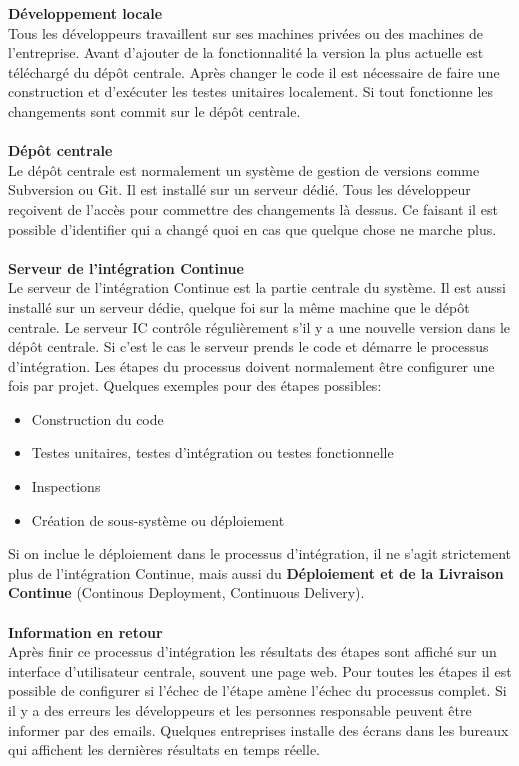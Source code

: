 \textbf{Développement locale}\\
Tous les développeurs travaillent sur ses machines privées ou des machines de l'entreprise. Avant d'ajouter de la fonctionnalité la version la plus actuelle est téléchargé du dépôt centrale. Après changer le code il est nécessaire de faire une construction et d'exécuter les testes unitaires localement. Si tout fonctionne les changements sont commit sur le dépôt centrale.\\\\
\textbf{Dépôt centrale}\\
Le dépôt centrale est normalement un système de gestion de versions comme Subversion ou Git. Il est installé sur un serveur dédié. Tous les développeur reçoivent de l'accès pour commettre des changements là dessus. Ce faisant il est possible d'identifier qui a changé quoi en cas que quelque chose ne marche plus.\\\\
\textbf{Serveur de l'intégration Continue} \\
Le serveur de l'intégration Continue est la partie centrale du système. Il est aussi installé sur un serveur dédie, quelque foi sur la même machine que le dépôt centrale. Le serveur IC contrôle régulièrement s'il y a une nouvelle version dans le dépôt centrale. Si c'est le cas le serveur prends le code et démarre le processus d'intégration. Les étapes du processus doivent normalement être configurer une fois par projet. Quelques exemples pour des étapes possibles:
\begin{itemize}
\item Construction du code
\item Testes unitaires, testes d'intégration ou testes fonctionnelle
\item Inspections
\item Création de sous-système ou déploiement
\end{itemize}
Si on inclue le déploiement dans le processus d'intégration, il ne s'agit strictement plus de l'intégration Continue, mais aussi du \textbf{Déploiement et de la Livraison Continue} (Continous Deployment, Continuous Delivery). 
\\\\
\textbf{Information en retour}\\
Après finir ce processus d'intégration les résultats des étapes sont affiché sur un interface d'utilisateur centrale, souvent une page web. Pour toutes les étapes il est possible de configurer si l'échec de l'étape amène l'échec du processus complet. Si il y a des erreurs les développeurs et les personnes responsable peuvent être informer par des emails. Quelques entreprises installe des écrans dans les bureaux qui affichent les dernières résultats en temps réelle.\\
